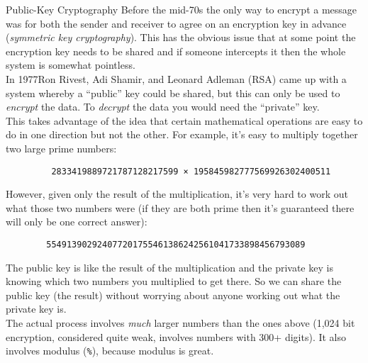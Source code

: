 
\begin{infobox}{Public-Key Cryptography}
    Before the mid-70s the only way to encrypt a message was for both the sender and receiver to agree on an encryption key in advance (\textit{symmetric key cryptography}). This has the obvious issue that at some point the encryption key needs to be shared and if someone intercepts it then the whole system is somewhat pointless.
    \\

    In 1977\footnotemark Ron Rivest, Adi Shamir, and Leonard Adleman (RSA) came up with a system whereby a ``public'' key could be shared, but this can only be used to \textit{encrypt} the data. To \textit{decrypt} the data you would need the ``private'' key.
    \\

    This takes advantage of the idea that certain mathematical operations are easy to do in one direction but not the other. For example, it's easy to multiply together two large prime numbers:

    \begin{verbatim}
         2833419889721787128217599 × 195845982777569926302400511
    \end{verbatim}

    However, given only the result of the multiplication, it's very hard to work out what those two numbers were (if they are both prime then it's guaranteed there will only be one correct answer):

    \begin{verbatim}
        554913902924077201755461386242561041733898456793089
    \end{verbatim}

    The public key is like the result of the multiplication and the private key is knowing which two numbers you multiplied to get there. So we can share the public key (the result) without worrying about anyone working out what the private key is.
    \\

    The actual process involves \textit{much} larger numbers than the ones above (1,024 bit encryption, considered quite weak, involves numbers with 300+ digits). It also involves modulus (\texttt{\%}), because modulus is great.
\end{infobox}



